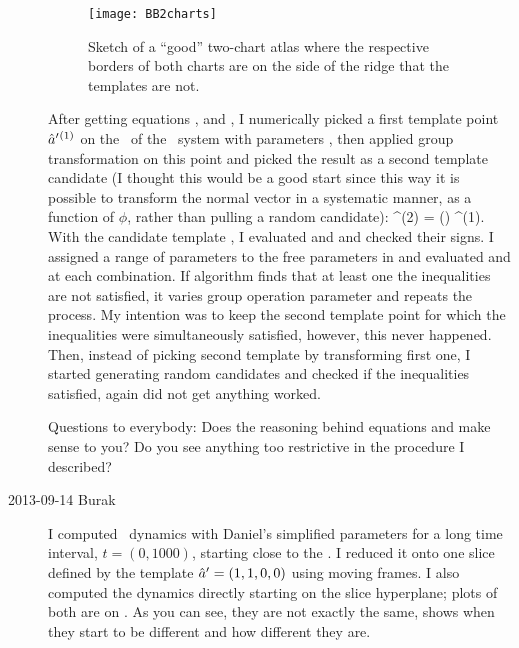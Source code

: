 \begin{description}
\begin{figure}
\begin{center}
  \texttt{[image: BB2charts]}
\end{center}
  \caption{Sketch of a ``good'' two-chart atlas where the respective borders of both charts are on the side of the ridge that the templates are not.}
\label{fig:BB2charts}
\end{figure}
After getting equations ,  and , I numerically picked a first template point ${\hat{a}'}{}^{(1)}$ on the \reqv\ of the \twomode\ system with parameters , then applied group transformation on this point and picked the result as a second template candidate (I thought this would be a good start since this way it is possible to transform the normal vector in a systematic manner, as a function of $\phi$, rather than pulling a random candidate):
\beq
	\slicep{}^{(2)} = \LieEl (\phi) \slicep{}^{(1)}.
	\label{eq:slicepcandidate}
\eeq
With the candidate template , I evaluated  and  and checked their signs. I assigned a range of parameters to the free parameters in  and evaluated  and  at each combination. If algorithm finds that at least one the inequalities are not satisfied, it varies group operation parameter and repeats the process. My intention was to keep the second template point for which the inequalities were simultaneously satisfied, however, this never happened. Then, instead of picking second template by transforming first one, I started generating random candidates and checked if the inequalities satisfied, again did not get anything worked.

Questions to everybody: Does the reasoning behind equations  and  make sense to you? Do you see anything too restrictive in the procedure I described?

\item[2013-09-14 Burak] I computed \twomode\ dynamics with Daniel's simplified parameters  for a long time interval,
$t = (0,1000)$, starting close to the \reqv.
 I reduced it onto one slice defined by the template ${\hat{a}'} = (1,1,0,0)$ using moving frames. I also computed the dynamics directly starting on the slice hyperplane; plots of both are on . As you can see, they are not exactly the same,  shows when they start to be different and how different they are.


\end{description}
